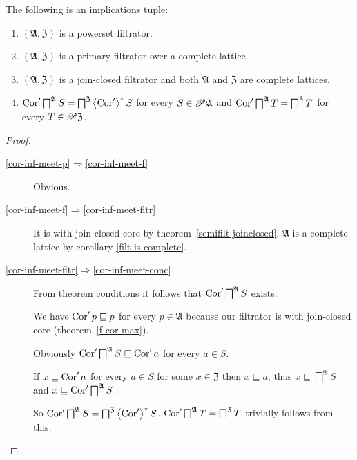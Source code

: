 \begin{thm}
\label{dual-cor-inf-meet}The following is an implications tuple:
\begin{enumerate}
\item \label{cor-inf-meet-p}$(\mathfrak{A},\mathfrak{Z})$ is a powerset
filtrator.
\item \label{cor-inf-meet-f}$(\mathfrak{A},\mathfrak{Z})$ is a primary filtrator
over a complete lattice.
\item \label{cor-inf-meet-fltr}$(\mathfrak{A},\mathfrak{Z})$ is a join-closed
filtrator and both $\mathfrak{A}$ and $\mathfrak{Z}$ are complete
lattices.
\item \label{cor-inf-meet-conc}$\operatorname{Cor}'\bigsqcap^{\mathfrak{A}}S=\bigsqcap^{\mathfrak{Z}}\left\langle \operatorname{Cor}'\right\rangle ^{\ast}S$
for every $S\in\mathscr{P}\mathfrak{A}$ and $\operatorname{Cor}'\bigsqcap^{\mathfrak{A}}T=\bigsqcap^{\mathfrak{Z}}T$
for every $T\in\mathscr{P}\mathfrak{Z}$.
\end{enumerate}
\end{thm}
\begin{proof}
~
\begin{description}
\item [{\ref{cor-inf-meet-p}$\Rightarrow$\ref{cor-inf-meet-f}}] Obvious.
\item [{\ref{cor-inf-meet-f}$\Rightarrow$\ref{cor-inf-meet-fltr}}] It
is with join-closed core by theorem~\ref{semifilt-joinclosed}.
$\mathfrak{A}$ is a complete lattice by corollary \ref{filt-is-complete}.
\item [{\ref{cor-inf-meet-fltr}$\Rightarrow$\ref{cor-inf-meet-conc}}] From
theorem conditions it follows that $\operatorname{Cor}'\bigsqcap^{\mathfrak{A}}S$
exists.


We have $\operatorname{Cor}'p\sqsubseteq p$ for every $p\in\mathfrak{A}$ because
our filtrator is with join-closed core (theorem~\ref{f-cor-max}).


Obviously $\operatorname{Cor}'\bigsqcap^{\mathfrak{A}}S\sqsubseteq\operatorname{Cor}'a$ for every
$a\in S$.


If $x\sqsubseteq\operatorname{Cor}'a$ for every $a\in S$ for some $x\in\mathfrak{Z}$
then $x\sqsubseteq a$, thus $x\sqsubseteq\bigsqcap^{\mathfrak{A}}S$
and $x\sqsubseteq\operatorname{Cor}'\bigsqcap^{\mathfrak{A}}S$.


So $\operatorname{Cor}'\bigsqcap^{\mathfrak{A}}S=\bigsqcap^{\mathfrak{Z}}\left\langle \operatorname{Cor}'\right\rangle ^{\ast}S$.
$\operatorname{Cor}'\bigsqcap^{\mathfrak{A}}T=\bigsqcap^{\mathfrak{Z}}T$ trivially
follows from this.

\end{description}
\end{proof}
